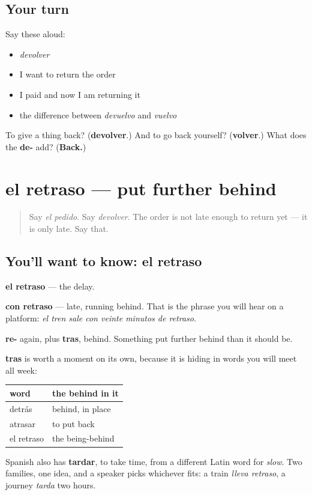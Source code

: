 \subsection*{Your turn}
Say these aloud:

\begin{itemize}
\raggedright
  \item \emph{devolver}
  \item I want to return the order
  \item I paid and now I am returning it
  \item the difference between \emph{devuelvo} and \emph{vuelvo}
\end{itemize}

\begin{tcolorbox}[breakable,colback=teal!4,colframe=teal!35!black,title={Before you move on}]
To give a thing back? (\textbf{devolver}.) And to go back yourself? (\textbf{volver}.) What does the \textbf{de-} add? (\textbf{Back.})
\end{tcolorbox}
\section[el retraso]{el retraso — put further behind}

\label{lesson:ES-C431-retraso}



\begin{quote}
Say \emph{el pedido}. Say \emph{devolver}. The order is not late enough to return yet — it is only late. Say that.
\end{quote}

\subsection*{You'll want to know: el retraso}
\textbf{el retraso} — the delay.

\textbf{con retraso} — late, running behind. That is the phrase you will hear on a platform: \emph{el tren sale con veinte minutos de retraso}.

\begin{cousinweb}
\textbf{re-} again, plus \textbf{tras}, behind. Something put further behind than it should be.

\textbf{tras} is worth a moment on its own, because it is hiding in words you will meet all week:

\noindent
\begin{tabularx}{\linewidth}{@{}>{\raggedright\arraybackslash}X>{\raggedright\arraybackslash}X@{}}
\toprule
\textbf{word} & \textbf{the behind in it} \\
\midrule
detrás & behind, in place \\
atrasar & to put back \\
el retraso & the being-behind \\
\bottomrule
\end{tabularx}

Spanish also has \textbf{tardar}, to take time, from a different Latin word for \emph{slow}. Two families, one idea, and a speaker picks whichever fits: a train \emph{lleva retraso}, a journey \emph{tarda} two hours.
\end{cousinweb}

